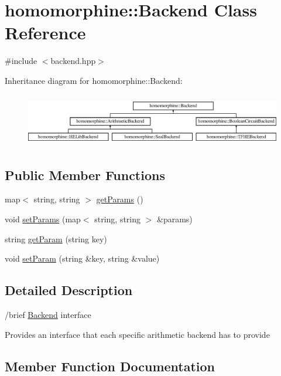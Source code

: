 \hypertarget{classhomomorphine_1_1_backend}{}\section{homomorphine\+:\+:Backend Class Reference}
\label{classhomomorphine_1_1_backend}


{\ttfamily \#include $<$backend.\+hpp$>$}

Inheritance diagram for homomorphine\+:\+:Backend\+:\begin{figure}[H]
\begin{center}
\leavevmode
\includegraphics[height=2.333333cm]{classhomomorphine_1_1_backend}
\end{center}
\end{figure}
\subsection*{Public Member Functions}
\begin{DoxyCompactItemize}
\item 
map$<$ string, string $>$ \hyperlink{classhomomorphine_1_1_backend_a107e05b3bd55271356a57fbc0c1df091}{get\+Params} ()
\item 
void \hyperlink{classhomomorphine_1_1_backend_aed04b9aa4eb2c08801e099b16b4da4b0}{set\+Params} (map$<$ string, string $>$ \&params)
\item 
string \hyperlink{classhomomorphine_1_1_backend_a34191d0dbdd9e300a88242156f90eb9b}{get\+Param} (string key)
\item 
void \hyperlink{classhomomorphine_1_1_backend_aacb924f4de6d50347d550da85aec15a2}{set\+Param} (string \&key, string \&value)
\end{DoxyCompactItemize}


\subsection{Detailed Description}
/brief \hyperlink{classhomomorphine_1_1_backend}{Backend} interface

Provides an interface that each specific arithmetic backend has to provide 

\subsection{Member Function Documentation}
\mbox{\label{classhomomorphine_1_1_backend_a34191d0dbdd9e300a88242156f90eb9b}} 
